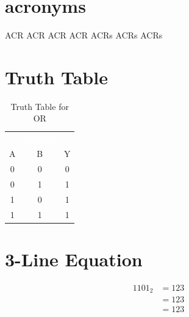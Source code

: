\section{acronyms}
\ac{ACR}   %
\acl{ACR}  %
\acf{ACR}  %
\acs{ACR}  %
\acp{ACR}  %
\acfp{ACR} %
\aclp{ACR} %

\section{Truth Table}
\begin{table}[H]
	\sffamily
	\newcommand{\head}[1]{\textcolor{white}{\textbf{#1}}}		
	\begin{center}
		\begin{tabular}{ccc} 
			\rowcolor{black!75}
			\multicolumn{2}{c}{\head{Inputs}} & \head{Output} \\
			A & B & Y \\
			\hline
			0 & 0 & 0 \\
			0 & 1 & 1 \\
			1 & 0 & 1 \\
			1 & 1 & 1 
		\end{tabular}
	\end{center}
	\caption{Truth Table for OR}
	\label{03:tab:truth_table_for_or}
\end{table}


\section{3-Line Equation}
\begin{align}
	\label{03:eq:identity_example}
	1101_2 &= 123 \\
	\nonumber
	&= 123 \\
	\nonumber
	&= 123
\end{align}


